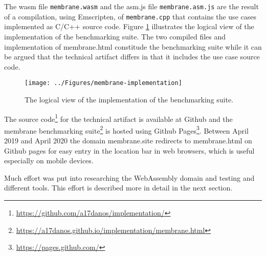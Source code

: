 \begin{comment}
\begin{figure}[!h]
\centering
\texttt{[image: ../Figures/membrane]}
\caption{The technical artifact in the form of a benchmarking suite named membrane.}
\label{membrane}
\end{figure}
\end{comment}


The wasm file \texttt{membrane.wasm} and the asm.js file \texttt{membrane.asm.js} are the result of a compilation, using Emscripten, of \texttt{membrane.cpp} that contains the use cases implemented as C/C++ source code. Figure \ref{membrane-implementation} illustrates the logical view of the implementation of the benchmarking suite. The two compiled files and implementation of membrane.html constitude the benchmarking suite while it can be argued that the technical artifact differs in that it includes the use case source code.

 
\begin{figure}[!h]
\centering
\texttt{[image: ../Figures/membrane-implementation]}
\caption{The logical view of the implementation of the benchmarking suite.}
\label{membrane-implementation}
\end{figure}
    
The source code\footnote{\url{https://github.com/a17danos/implementation/}} for the technical artifact is available at Github and the membrane benchmarking suite\footnote{\url{https://a17danos.github.io/implementation/membrane.html}} is hosted using Github Pages\footnote{\url{https://pages.github.com/}}. Between April 2019 and April 2020 the domain membrane.site redirects to membrane.html on Github pages for easy entry in the location bar in web browsers, which is useful especially on mobile devices.


Much effort was put into researching the WebAssembly domain and testing and different tools. This effort is described more in detail in the next section.

